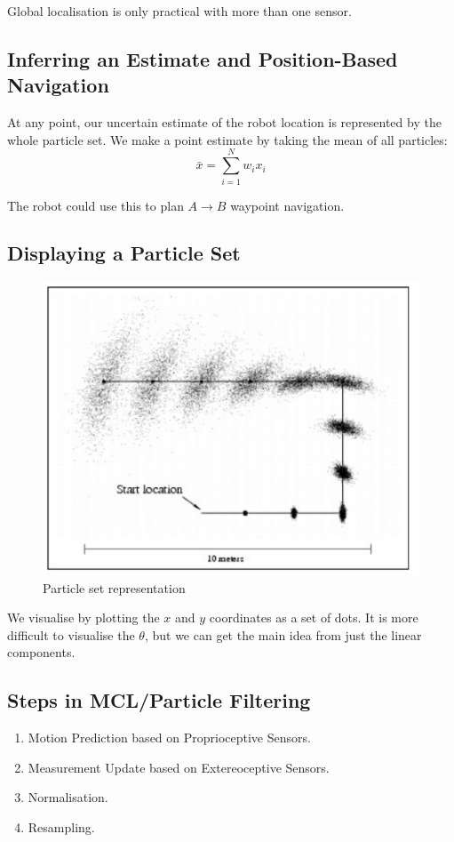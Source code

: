 \documentclass[11pt]{article}
\begin{document}
Global localisation is only practical with more than one sensor.

\subsection{Inferring an Estimate and Position-Based Navigation}
At any point, our uncertain estimate of the robot location is represented by the whole particle set.
We make a point estimate by taking the mean of all particles:
\[
  \bar{x} = \sum_{i = 1}^N w_i x_i
\]

The robot could use this to plan $A \rightarrow B$ waypoint navigation.

\subsection{Displaying a Particle Set}
\begin{figure}[h]
  \caption{Particle set representation}
  \includegraphics[scale=0.4]{particleset}
  \centering
\end{figure}

We visualise by plotting the $x$ and $y$ coordinates as a set of dots.
It is more difficult to visualise the $\theta$, but we can get the main idea from just the linear components.

\subsection{Steps in MCL/Particle Filtering}
\begin{enumerate}
  \item Motion Prediction based on Proprioceptive Sensors.
  \item Measurement Update based on Extereoceptive Sensors.
  \item Normalisation.
  \item Resampling.
\end{enumerate}
\end{document}
